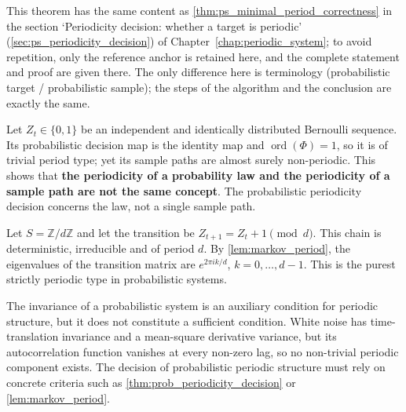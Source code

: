 \begin{theorem}\label{thm:prob_minimal_period_correctness}
This theorem has the same content as \cref{thm:ps_minimal_period_correctness} in the section `Periodicity decision: whether a target is periodic' (\cref{sec:ps_periodicity_decision}) of Chapter~\ref{chap:periodic_system}; to avoid repetition, only the reference anchor is retained here, and the complete statement and proof are given there. The only difference here is terminology (probabilistic target / probabilistic sample); the steps of the algorithm and the conclusion are exactly the same.
\end{theorem}

\begin{example}\label{ex:bernoulli_period}
Let $Z_t\in\{0,1\}$ be an independent and identically distributed Bernoulli sequence. Its probabilistic decision map is the identity map and $\operatorname{ord}(\Phi)=1$, so it is of trivial period type; yet its sample paths are almost surely non-periodic. This shows that \textbf{the periodicity of a probability law and the periodicity of a sample path are not the same concept}. The probabilistic periodicity decision concerns the law, not a single sample path.
\end{example}

\begin{example}\label{ex:cyclic_markov}
Let $S=\mathbb Z/d\mathbb Z$ and let the transition be $Z_{t+1}=Z_t+1\pmod d$. This chain is deterministic, irreducible and of period $d$. By \cref{lem:markov_period}, the eigenvalues of the transition matrix are $e^{2\pi i k/d}$, $k=0,\dots,d-1$. This is the purest strictly periodic type in probabilistic systems.
\end{example}

\begin{remark}\label{rem:prob_invariant_not_period}
The invariance of a probabilistic system is an auxiliary condition for periodic structure, but it does not constitute a sufficient condition. White noise has time-translation invariance and a mean-square derivative variance, but its autocorrelation function vanishes at every non-zero lag, so no non-trivial periodic component exists. The decision of probabilistic periodic structure must rely on concrete criteria such as \cref{thm:prob_periodicity_decision} or \cref{lem:markov_period}.
\end{remark}

